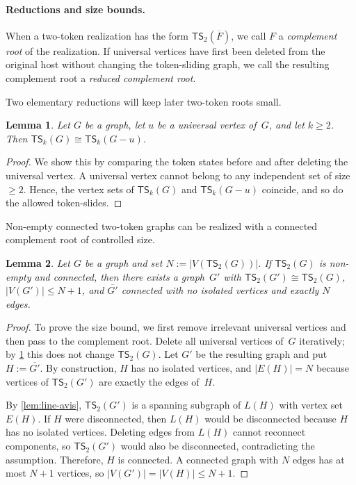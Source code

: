 \documentclass[a4paper]{article}
\theoremstyle{plain}
\newtheorem{lemma}[lemma]{Lemma}
\theoremstyle{definition}
\newcommand{\TSsym}{\mathsf{TS}}
\numberwithin{equation}{section}
\begin{document}
\paragraph{Reductions and size bounds.}

When a two-token realization has the form $\TSsym_2(\overline{F})$, we call $F$ a \emph{complement root} of the realization.
If universal vertices have first been deleted from the original host without changing the token-sliding graph, we call the resulting complement root a \emph{reduced complement root}.

Two elementary reductions will keep later two-token roots small.

\begin{lemma}
\label{lem:universal}
Let $G$ be a graph, let $u$ be a universal vertex of~$G$, and let $k\ge 2$.
Then $\TSsym_k(G)\cong \TSsym_k(G-u)$.
\end{lemma}

\begin{proof}
We show this by comparing the token states before and after deleting the universal vertex.
A universal vertex cannot belong to any independent set of size~$\ge 2$.
Hence, the vertex sets of $\TSsym_k(G)$ and $\TSsym_k(G-u)$ coincide, and so do the allowed token-slides.
\end{proof}

Non-empty connected two-token graphs can be realized with a connected complement root of controlled size.

\begin{lemma}
\label{lem:sizebound}
Let $G$ be a graph and set $N:=|V(\TSsym_2(G))|$.
If $\TSsym_2(G)$ is non-empty and connected, then there exists a graph~$G'$ with $\TSsym_2(G')\cong \TSsym_2(G)$, $|V(G')|\le N+1$, and $\overline{G'}$ connected with no isolated vertices and exactly $N$ edges.
\end{lemma}

\begin{proof}
To prove the size bound, we first remove irrelevant universal vertices and then pass to the complement root.
Delete all universal vertices of~$G$ iteratively; by \cref{lem:universal} this does not change $\TSsym_2(G)$.
Let $G'$ be the resulting graph and put $H:=\overline{G'}$.
By construction, $H$ has no isolated vertices, and $|E(H)|=N$ because vertices of $\TSsym_2(G')$ are exactly the edges of~$H$.

By \cref{lem:line-avis}, $\TSsym_2(G')$ is a spanning subgraph of $L(H)$ with vertex set $E(H)$.
If $H$ were disconnected, then $L(H)$ would be disconnected because $H$ has no isolated vertices.
Deleting edges from $L(H)$ cannot reconnect components, so $\TSsym_2(G')$ would also be disconnected, contradicting the assumption.
Therefore, $H$ is connected.
A connected graph with $N$ edges has at most $N+1$ vertices, so $|V(G')|=|V(H)|\le N+1$.
\end{proof}
\end{document}
